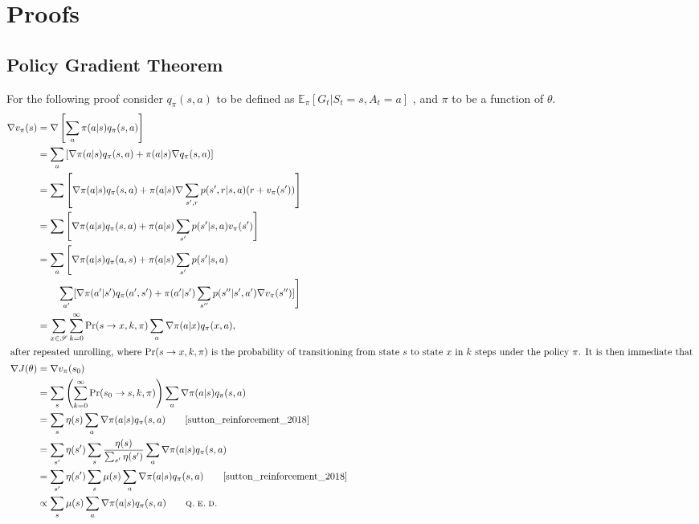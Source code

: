 
\chapter{Proofs}\label{appendix:proofs}
\section{Policy Gradient Theorem}\label{appendix:sec:pg}
\begin{tcolorbox}[colback=white!5!white,colframe=white!50!black,
  colbacktitle=white!75!black,title=Proof of the Policy Gradient Theorem (episodic case)]
  For the following proof consider $q_\pi(s,a)$ to be defined as $\mathbb{E}_\pi[G_t|S_t=s,A_t=a]$ , and $\pi$ to be a function of $\theta$.
  \tcblower
  \begin{align*}
  \nabla v_\pi(s) &= \nabla \left[\sum_{a}\pi(a|s)q_\pi(s,a)\right] \MoveEqLeft[1]\\
  &= \sum_{a}\left[\nabla \pi(a|s)q_\pi(s,a)+\pi(a|s)\nabla q_\pi(s,a)\right] \\
  &= \sum \left[\nabla \pi(a|s)q_\pi(s,a) + \pi(a|s)\nabla \sum_{s', r} p(s',r|s,a) (r + v_\pi(s'))\right] \\
  &= \sum \left[\nabla \pi(a|s)q_\pi(s,a) + \pi(a|s) \sum_{s'} p(s'|s,a) v_\pi(s')\right] \\
  &= \sum_{a}\left[\nabla \pi(a|s)q_\pi(a,s) + \pi(a|s)\sum_{s'}p(s'|s,a) \right. \\
  &\qquad \left. \sum_{a'}[\nabla \pi(a'|s')q_\pi(a',s') + \pi(a'|s')\sum_{s''}p(s''|s',a')\nabla v_\pi(s'')]\right] \\
  &= \sum_{x \in \mathset{S}}\sum_{k=0}^{\infty}\operatorname{Pr}(s \rightarrow x, k, \pi)\sum_a \nabla \pi(a|x)q_\pi(x,a), \\
  \intertext{
  after repeated unrolling, where $\operatorname{Pr}(s \rightarrow x, k, \pi)$ is the probability of transitioning from state $s$ to state $x$ in $k$ steps under the policy $\pi$. It is then immediate that 
  } 
  \nabla J(\theta) &= \nabla v_\pi(s_0) \\
  &= \sum_{s}\left(\sum_{k=0}^{\infty} \operatorname{Pr}( s_0 \rightarrow s, k, \pi)\right)\sum_{a}\nabla \pi(a|s)q_\pi(s,a) \\
  &= \sum_s \eta(s) \sum_{a}\nabla \pi(a|s)q_\pi(s,a) \tag*{\citepg{199}} \\
  &= \sum_{s'} \eta(s') \sum_s \frac{\eta(s)}{\sum_{s'}\eta(s')} \sum_{a}\nabla \pi(a|s)q_\pi(s,a) \\
  &= \sum_{s'} \eta(s') \sum_s \mu(s) \sum_{a}\nabla \pi(a|s)q_\pi(s,a) \tag*{\citepg{199}}\\
  &\propto \sum_s \mu(s) \sum_{a}\nabla \pi(a|s)q_\pi(s,a) \tag*{\scshape q.\:e.\:d.}
  \end{align*}
 
\end{tcolorbox}
